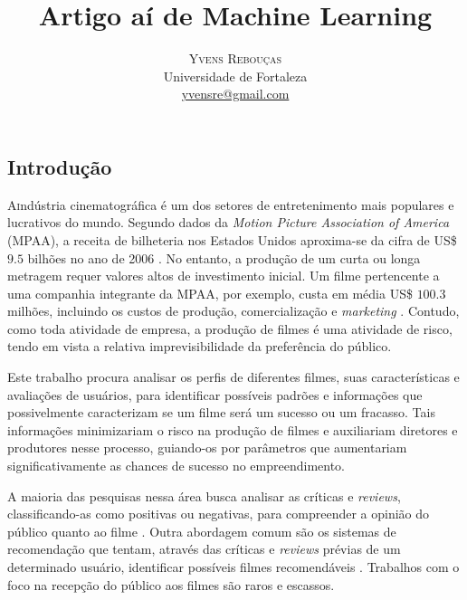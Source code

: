 \documentclass[twoside]{article}
\title{\vspace{-15mm}\fontsize{24pt}{10pt}\selectfont\textbf{Artigo aí de Machine Learning}} %
\author{
\large
\textsc{Yvens Rebouças}\\[2mm] %
\normalsize Universidade de Fortaleza \\ %
\normalsize \href{mailto:yvensre@gmail.com}{yvensre@gmail.com} %
\vspace{-5mm}
}
\date{}
\begin{document}
\maketitle %

\thispagestyle{fancy} %


\begin{multicols}{2} %

\section{Introdução}

\lettrine[nindent=0em,lines=3]
A indústria cinematográfica é um dos setores de entretenimento mais populares e lucrativos do mundo. Segundo dados da \textit{Motion Picture Association of America} (MPAA), a receita de bilheteria nos Estados Unidos aproxima-se da cifra de US\$ $9.5$ bilhões no ano de 2006 \cite{cinema_livro}. No entanto, a produção de um curta ou longa metragem requer valores altos de investimento inicial. Um filme pertencente a uma companhia integrante da MPAA, por exemplo, custa em média US\$ $100.3$ milhões, incluindo os custos de produção, comercialização e \textit{marketing} \cite{cinema_livro}. Contudo, como toda atividade de empresa, a produção de filmes é uma atividade de risco, tendo em vista a relativa imprevisibilidade da preferência do público.

Este trabalho procura analisar os perfis de diferentes filmes, suas características e avaliações de usuários, para identificar possíveis padrões e informações que possivelmente caracterizam se um filme será um sucesso ou um fracasso. Tais informações minimizariam o risco na produção de filmes e auxiliariam diretores e produtores nesse processo, guiando-os por parâmetros que aumentariam significativamente as chances de sucesso no empreendimento.

A maioria das pesquisas nessa área busca analisar as críticas e \textit{reviews}, classificando-as como positivas ou negativas, para compreender a opinião do público quanto ao filme \cite{artigo1, artigo2, artigo3}. Outra abordagem comum são os sistemas de recomendação que tentam, através das críticas e \textit{reviews} prévias de um determinado usuário, identificar possíveis filmes recomendáveis \cite{artigo4}. Trabalhos com o foco na recepção do público aos filmes são raros e escassos.


\end{multicols}
\end{document}
